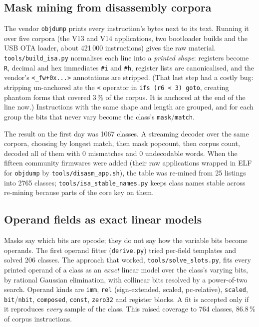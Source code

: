 \documentclass[10pt,a4paper]{article}
\newcommand{\code}[1]{\texttt{#1}}
\begin{document}
\subsection{Mask mining from disassembly corpora}
The vendor \code{objdump} prints every instruction's bytes next to its text. Running it over five
corpora (the V13 and V14 applications, two bootloader builds and the USB OTA loader, about 421\,000
instructions) gives the raw material. \code{tools/build\_isa.py} normalises each line into a
\emph{printed shape}: registers become \code{R}, decimal and hex immediates \code{\#i} and
\code{\#h}, register lists are canonicalised, and the vendor's \code{<\_fw+0x...>} annotations are
stripped. (That last step had a costly bug: stripping un-anchored ate the \code{<} operator in
\code{ifs (r6 < 3) goto}, creating phantom forms that covered 3\,\% of the corpus. It is anchored at
the end of the line now.) Instructions with the same shape and length are grouped, and for each
group the bits that never vary become the class's \code{mask}/\code{match}.

The result on the first day was 1067 classes. A streaming decoder over the same corpora, choosing
by longest match, then mask popcount, then corpus count, decoded all of them with 0 mismatches and
0 undecodable words. When the fifteen community firmwares were added (their raw applications
wrapped in ELF for \code{objdump} by \code{tools/disasm\_app.sh}), the table was re-mined from 25
listings into 2765 classes; \code{tools/isa\_stable\_names.py} keeps class names stable across
re-mining because parts of the core key on them.

\subsection{Operand fields as exact linear models}
Masks say which bits are opcode; they do not say how the variable bits become operands. The first
operand fitter (\code{derive.py}) tried per-field templates and solved 206 classes. The approach
that worked, \code{tools/solve\_slots.py}, fits every printed operand of a class as an \emph{exact}
linear model over the class's varying bits, by rational Gaussian elimination, with collinear bits
resolved by a power-of-two search. Operand kinds are \code{imm}, \code{rel} (sign-extended, scaled,
pc-relative), \code{scaled}, \code{bit}/\code{nbit}, \code{composed}, \code{const}, \code{zero32} and
register blocks. A fit is accepted only if it reproduces \emph{every} sample of the class. This
raised coverage to 764 classes, 86.8\,\% of corpus instructions.
\end{document}
